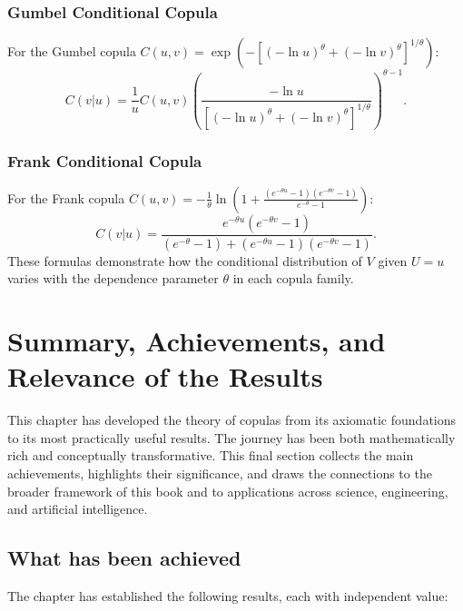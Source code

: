 \subsubsection*{Gumbel Conditional Copula}
For the Gumbel copula $C(u,v) = \exp\left(-\left[(-\ln u)^\theta + (-\ln v)^\theta\right]^{1/\theta}\right)$:
\begin{equation}
C(v|u) = \frac{1}{u} C(u,v) \left(\frac{-\ln u}{\left[(-\ln u)^\theta + (-\ln v)^\theta\right]^{1/\theta}}\right)^{\theta-1}.
\end{equation}
\subsubsection*{Frank Conditional Copula}
For the Frank copula $C(u,v) = -\frac{1}{\theta} \ln\left(1 + \frac{(e^{-\theta u} - 1)(e^{-\theta v} - 1)}{e^{-\theta} - 1}\right)$:
\begin{equation}
C(v|u) = \frac{e^{-\theta u}(e^{-\theta v} - 1)}{(e^{-\theta} - 1) + (e^{-\theta u} - 1)(e^{-\theta v} - 1)}.
\end{equation}
These formulas demonstrate how the conditional distribution of $V$ given $U=u$ varies with the dependence parameter $\theta$ in each copula family.


\section{Summary, Achievements, and Relevance of the Results}

This chapter has developed the theory of copulas from its axiomatic foundations to
its most practically useful results. The journey has been both mathematically rich
and conceptually transformative. This final section collects the main achievements,
highlights their significance, and draws the connections to the broader framework of
this book and to applications across science, engineering, and artificial intelligence.

\subsection*{What has been achieved}

The chapter has established the following results, each with independent value:

